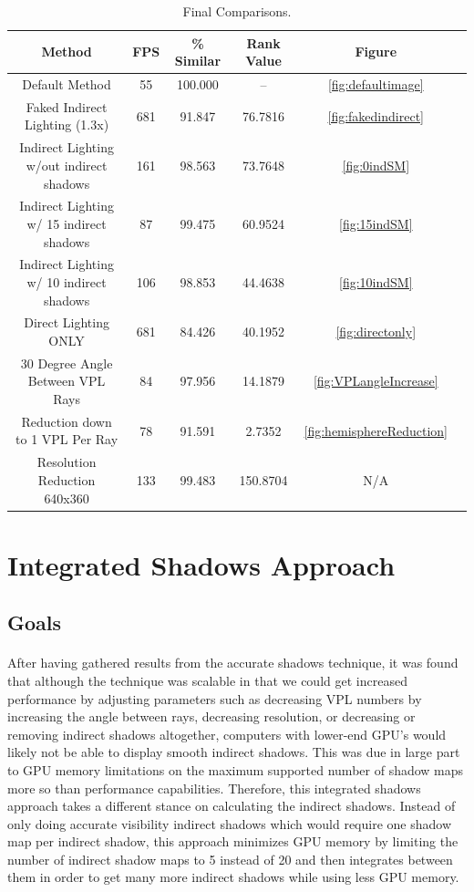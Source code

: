 \begin{table}[h!]\centering
	\caption{Final Comparisons.}
	\begin{center}
	    \begin{tabular}{ | c | c | c | c | c | c |}
	    \hline
	    Method & FPS & \% Similar & Rank Value & Figure\\ \hline
	    Default Method & 55 & 100.000 & -- & \ref{fig:defaultimage}\\ \hline
	    Faked Indirect Lighting (1.3x) & 681 & 91.847 & 76.7816 & \ref{fig:fakedindirect}\\ \hline
	    Indirect Lighting w/out indirect shadows & 161 & 98.563 & 73.7648 & \ref{fig:0indSM}\\ \hline
	    Indirect Lighting w/ 15 indirect shadows & 87 & 99.475 & 60.9524 & \ref{fig:15indSM}\\ \hline
	    Indirect Lighting w/ 10 indirect shadows & 106 & 98.853 & 44.4638 & \ref{fig:10indSM}\\ \hline
	    Direct Lighting ONLY & 681 & 84.426 & 40.1952 & \ref{fig:directonly}\\ \hline
	    30 Degree Angle Between VPL Rays & 84 & 97.956 & 14.1879 & \ref{fig:VPLangleIncrease}\\ \hline
	    Reduction down to 1 VPL Per Ray & 78 & 91.591 & 2.7352 & \ref{fig:hemisphereReduction}\\ \hline
	    Resolution Reduction 640x360 & 133 & 99.483 & 150.8704 & N/A\\ \hline
	    \end{tabular}
	\end{center}
	\label{table:5.10}
\end{table}

\section{Integrated Shadows Approach} \label{sec:newApproach}
\subsection{Goals}
\paragraph{}
After having gathered results from the accurate shadows technique, it was found that although the technique was scalable in that we could get increased performance by adjusting parameters such as decreasing VPL numbers by increasing the angle between rays, decreasing resolution, or decreasing or removing indirect shadows altogether, computers with lower-end GPU's would likely not be able to display smooth indirect shadows.  This was due in large part to GPU memory limitations on the maximum supported number of shadow maps more so than performance capabilities.  Therefore, this integrated shadows approach takes a different stance on calculating the indirect shadows.  Instead of only doing accurate visibility indirect shadows which would require one shadow map per indirect shadow, this approach minimizes GPU memory by limiting the number of indirect shadow maps to 5 instead of 20 and then integrates between them in order to get many more indirect shadows while using less GPU memory.

